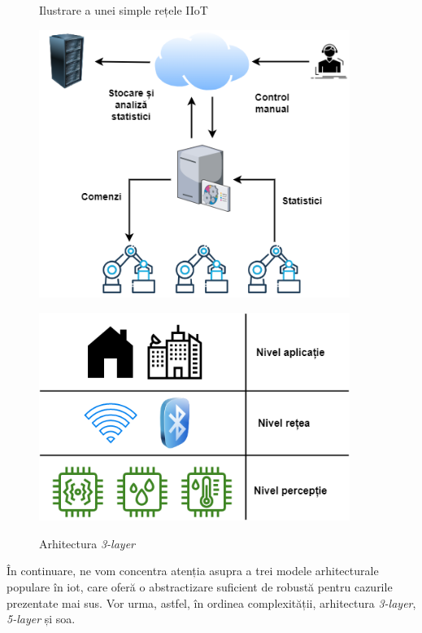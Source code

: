 \begin{figure}
    \centering
    \begin{minipage}{0.45\textwidth}
        \caption{Ilustrare a unei simple rețele IIoT}
        \centering
        \includegraphics[width=0.9\textwidth]{images/exemplu_retea_iot_Cap3.drawio.png}
        \label{fig:exemplu_iiot}
    \end{minipage}\hfill
    \begin{minipage}{0.45\textwidth}
        \caption{Arhitectura \textit{3-layer}}
        \centering
        \includegraphics[width=0.9\textwidth]{images/3_layer.drawio.png}
        \label{fig:arch_3layer}
    \end{minipage}
\end{figure}

În continuare, ne vom concentra atenția asupra a trei modele arhitecturale populare în \acrshort{iot}, care oferă o abstractizare suficient de robustă pentru cazurile prezentate mai sus. Vor urma, astfel, în ordinea complexității, arhitectura \textit{3-layer}, \textit{5-layer} și \acrlong{soa}.

